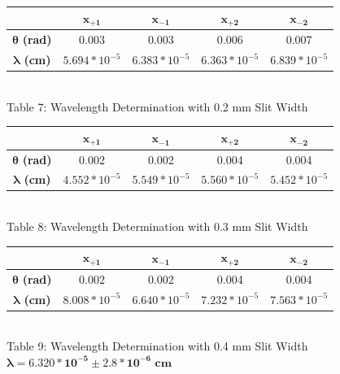 \begin{center}
    \vspace{6mm} 
    \centering
    \begin{tabular}{|c|c|c|c|c|}
        \hline
        & $\bm{x_{+1}}$ &$\bm{x_{-1}}$ & $\bm{x_{+2}}$ & $\bm{x_{-2}}$  \\ \hline
        $\bm{\theta}$ \textbf{(rad)} & 0.003 & 0.003 & 0.006 & 0.007 \\
        $\bm{\lambda}$ \textbf{(cm)} & $5.694*10^{-5}$ & $6.383*10^{-5}$ & $6.363*10^{-5}$ & $6.839*10^{-5}$ \\ \hline
    \end{tabular} 
    \vspace{3mm}
    \\ Table 7: Wavelength Determination with 0.2 mm Slit Width\\
    \vspace{5mm}
    \centering
    \begin{tabular}{|c|c|c|c|c|}
        \hline
        & $\bm{x_{+1}}$ &$\bm{x_{-1}}$ & $\bm{x_{+2}}$ & $\bm{x_{-2}}$  \\ \hline
        $\bm{\theta}$ \textbf{(rad)} & 0.002 & 0.002 & 0.004 & 0.004 \\
        $\bm{\lambda}$ \textbf{(cm)} & $4.552*10^{-5}$ & $5.549*10^{-5}$ & $5.560*10^{-5}$ & $5.452*10^{-5}$ \\ \hline
    \end{tabular} 
    \vspace{3mm}
    \\ Table 8: Wavelength Determination with 0.3 mm Slit Width\\
    \vspace{5mm}
    \begin{tabular}{|c|c|c|c|c|}
        \hline
        & $\bm{x_{+1}}$ &$\bm{x_{-1}}$ & $\bm{x_{+2}}$ & $\bm{x_{-2}}$  \\ \hline
        $\bm{\theta}$ \textbf{(rad)} & 0.002 & 0.002 & 0.004 & 0.004 \\
        $\bm{\lambda}$ \textbf{(cm)} & $8.008*10^{-5}$ & $6.640*10^{-5}$ & $7.232*10^{-5}$ & $7.563*10^{-5}$ \\ \hline
    \end{tabular} 
    \vspace{3mm}
    \\ Table 9: Wavelength Determination with 0.4 mm Slit Width\\
    \vspace{5mm}
    $\boxed{\bm{\lambda=6.320*10^{-5} \pm 2.8*10^{-6}}\textbf{ cm}}$

\end{center}
